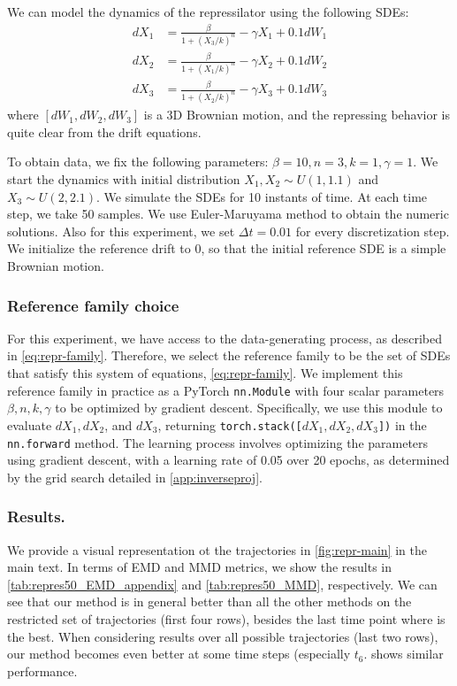 We can model the dynamics of the repressilator using the following SDEs:
\begin{align}
\label{eq:repr-family}
    dX_1&=\frac{\beta}{1+(X_3/k)^n}-\gamma X_1+0.1dW_1 \nonumber \\
    dX_2&=\frac{\beta}{1+(X_1/k)^n}-\gamma X_2+0.1dW_2\\
    dX_3&=\frac{\beta}{1+(X_2/k)^n}-\gamma X_3+0.1dW_3 \nonumber
\end{align}
where $[dW_1,dW_2,dW_3]$ is a 3D Brownian motion, and the repressing behavior is quite clear from the drift equations. 

To obtain data, we fix the following parameters: $\beta = 10, n=3, k = 1, \gamma = 1$. We start the dynamics with initial distribution $X_1, X_2\sim U(1,1.1)$ and $X_3\sim U(2,2.1)$. We simulate the SDEs for 10 instants of time. At each time step, we take 50 samples. We use Euler-Maruyama method to obtain the numeric solutions. Also for this experiment, we set $\Delta t = 0.01$ for every discretization step. We initialize the reference drift to 0, so that the initial reference SDE is a simple Brownian motion.

\subsubsection{Reference family choice}
\label{app:repr_implementation}
For this experiment, we have access to the data-generating process, as described in \cref{eq:repr-family}. Therefore, we select the reference family to be the set of SDEs that satisfy this system of equations, \cref{eq:repr-family}. We implement this reference family in practice as a PyTorch \texttt{nn.Module} with four scalar parameters \(\beta, n, k, \gamma\) to be optimized by gradient descent. Specifically, we use this module to evaluate \(dX_1, dX_2\), and \(dX_3\), returning \texttt{torch.stack([$dX_1, dX_2, dX_3$])} in the \texttt{nn.forward} method. The learning process involves optimizing the parameters using gradient descent, with a learning rate of 0.05 over 20 epochs, as determined by the grid search detailed in \cref{app:inverseproj}.

\subsubsection{Results.} We provide a visual representation ot the trajectories in \cref{fig:repr-main} in the main text. In terms of EMD and MMD metrics, we show the results in \cref{tab:repres50_EMD_appendix} and \cref{tab:repres50_MMD}, respectively. We can see that our method is in general better than all the other methods on the restricted set of trajectories (first four rows), besides the last time point where \vanilla{} is the best. When considering results over all possible trajectories (last two rows), our method becomes even better at some time steps (especially $t_6$. \vanilla{} shows similar performance.



